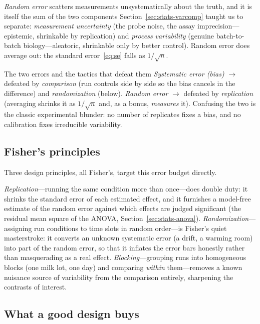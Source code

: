 \emph{Random error} scatters measurements unsystematically about the truth, and
it is itself the sum of the two components Section~\ref{sec:stats-varcomp} taught
us to separate: \emph{measurement uncertainty} (the probe noise, the assay
imprecision---epistemic, shrinkable by replication) and \emph{process
variability} (genuine batch-to-batch biology---aleatoric, shrinkable only by
better control). Random error does average out: the standard
error~\eqref{eq:se} falls as $1/\sqrt n$.

\begin{keybox}{The two errors and the tactics that defeat them}
\emph{Systematic error (bias)} $\to$ defeated by \emph{comparison} (run controls
side by side so the bias cancels in the difference) and \emph{randomization}
(below). \emph{Random error} $\to$ defeated by \emph{replication} (averaging
shrinks it as $1/\sqrt n$ and, as a bonus, \emph{measures} it). Confusing the two
is the classic experimental blunder: no number of replicates fixes a bias, and no
calibration fixes irreducible variability.
\end{keybox}

\subsection{Fisher's principles}

Three design principles, all Fisher's, target this error budget directly.

\emph{Replication}---running the same condition more than once---does double duty:
it shrinks the standard error of each estimated effect, and it furnishes a
model-free estimate of the random error against which effects are judged
significant (the residual mean square of the ANOVA,
Section~\ref{sec:stats-anova}). \emph{Randomization}---assigning run conditions to
time slots in random order---is Fisher's quiet masterstroke: it converts an
unknown systematic error (a drift, a warming room) into part of the random error,
so that it inflates the error bars honestly rather than masquerading as a real
effect. \emph{Blocking}---grouping runs into homogeneous blocks (one milk lot, one
day) and comparing \emph{within} them---removes a known nuisance source of
variability from the comparison entirely, sharpening the contrasts of interest.

\subsection{What a good design buys}

